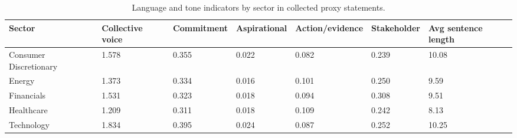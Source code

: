 \begin{table}[htbp]
\centering
\caption{Language and tone indicators by sector in collected proxy statements.}
\label{tab:sector_language_tone}
\begin{tabular}{lllllll}
\hline
Sector & Collective voice & Commitment & Aspirational & Action/evidence & Stakeholder & Avg sentence length \\
\hline
Consumer Discretionary & 1.578 & 0.355 & 0.022 & 0.082 & 0.239 & 10.08 \\
Energy & 1.373 & 0.334 & 0.016 & 0.101 & 0.250 & 9.59 \\
Financials & 1.531 & 0.323 & 0.018 & 0.094 & 0.308 & 9.51 \\
Healthcare & 1.209 & 0.311 & 0.018 & 0.109 & 0.242 & 8.13 \\
Technology & 1.834 & 0.395 & 0.024 & 0.087 & 0.252 & 10.25 \\
\hline
\end{tabular}
\end{table}

